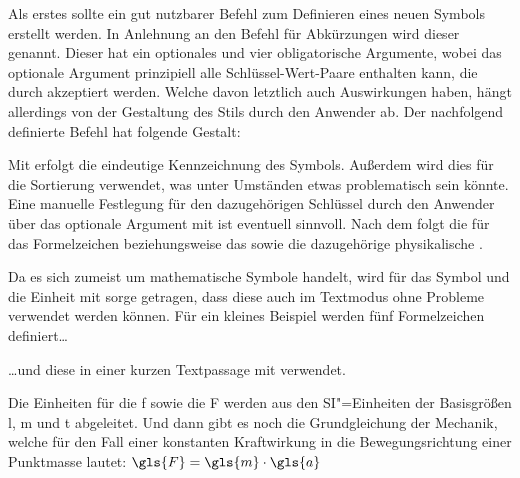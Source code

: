\documentclass[%
  english,ngerman,%
  geometry=no,DIV=12,automark,%
]{tudscrartcl}
\begin{document}
Als erstes sollte ein gut nutzbarer Befehl zum Definieren eines neuen Symbols 
erstellt werden. In Anlehnung an den Befehl für Abkürzungen wird dieser 
 genannt. Dieser hat ein optionales und vier obligatorische 
Argumente, wobei das optionale Argument prinzipiell alle Schlüssel-Wert-Paare 
enthalten kann, die durch  akzeptiert werden. Welche davon 
letztlich auch Auswirkungen haben, hängt allerdings von der Gestaltung des 
Stils durch den Anwender ab. Der nachfolgend definierte Befehl hat folgende 
Gestalt:
%
\par\vspace{\baselineskipglue}\noindent
{}\LParameter{}%
\par\vspace{\baselineskipglue}\noindent
%
Mit  erfolgt die eindeutige Kennzeichnung des Symbols. Außerdem 
wird dies für die Sortierung verwendet, was unter Umständen etwas problematisch 
sein könnte. Eine manuelle Festlegung für den dazugehörigen Schlüssel durch den 
Anwender über das optionale Argument mit  ist 
eventuell sinnvoll. Nach dem  folgt die  für 
das Formelzeichen beziehungsweise das  sowie die dazugehörige 
physikalische .
%
\InputHook{\let\newcommand\renewcommand}
\begin{Excerpt}
\newcommand*{\newsymbol}[5][]{%
  \newglossaryentry{#2}{%
    type=symbols,%
    description={},%
    name={#3},%
    symbol={\ensuremath{#4}},%
    user1={\ensuremath{\mathrm{#5}}},%
    sort={#2},%
    #1%
  }%
}
\end{Excerpt}
%
Da es sich zumeist um mathematische Symbole handelt, wird für das Symbol und 
die Einheit mit  sorge getragen, dass diese auch im 
Textmodus ohne Probleme verwendet werden können. 
Für ein kleines Beispiel werden fünf Formelzeichen definiert\dots
%
\begin{Excerpt}
\end{Excerpt}
%
\dots und diese in einer kurzen Textpassage mit  
verwendet.
%
\begin{Hint}
Die Einheiten für die \gls{f} sowie die \gls{F} werden aus den 
SI"=Einheiten der Basisgrößen \gls{l}, \gls{m} und \gls{t} abgeleitet.
Und dann gibt es noch die Grundgleichung der Mechanik, welche für den
Fall einer konstanten Kraftwirkung in die Bewegungsrichtung einer
Punktmasse lautet:
$\gls{F} = \gls{m} \cdot \gls{a}$
\end{Hint}
\end{document}
